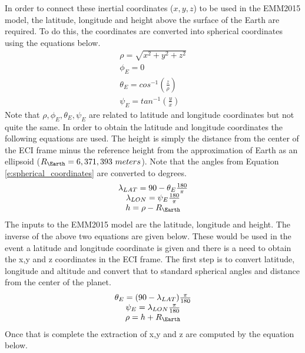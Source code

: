 \noindent In order to connect these inertial coordinates ($x,y,z$) to
be used in the EMM2015 model, the latitude, longitude and height above
the surface of the Earth are required. To do this, the coordinates are
converted into spherical coordinates using the equations below.
\begin{equation}\label{e:spherical_coordinates}
  \begin{matrix}
    \rho = \sqrt{x^2+y^2+z^2} \\
    \phi_E = 0 \\
    \theta_E = cos^{-1}\left( \frac{z}{\rho}\right) \\
    \psi_E = tan^{-1}\left( \frac{y}{x}\right)
  \end{matrix}
\end{equation}
Note that $\rho,\phi_E,\theta_E,\psi_E$ are related to latitude and
longitude coordinates but not quite the same. In order to obtain the
latitude and longitude coordinates the following equations are
used. The height is simply the distance from the center of the ECI
frame minus the reference height from the approximation of Earth as an
ellipsoid ($R_{\Earth}=6,371,393~meters$). Note that the angles from Equation
\ref{e:spherical_coordinates} are converted to degrees. 
\begin{equation}
  \begin{matrix}
    \lambda_{LAT} = 90 - \theta_E\frac{180}{\pi}\\
    \lambda_{LON} = \psi_E\frac{180}{\pi} \\
    h = \rho - R_{\Earth}
  \end{matrix}
\end{equation}
The inputs to the EMM2015 model are the latitude, longitude and height. The inverse of the above two equations are given below. These would be used in the event a latitude and longitude coordinate is given and there is a need to obtain the x,y and z coordinates in the ECI frame. The first step is to convert latitude, longitude and altitude and convert that to standard spherical angles and distance from the center of the planet.
\begin{equation}
\begin{matrix}
\theta_E = (90 - \lambda_{LAT})\frac{\pi}{180}\\
\psi_E = \lambda_{LON}\frac{\pi}{180}\\
\rho = h + R_{\Earth}
\end{matrix}
\end{equation}
Once that is complete the extraction of x,y and z are computed by the equation below.
